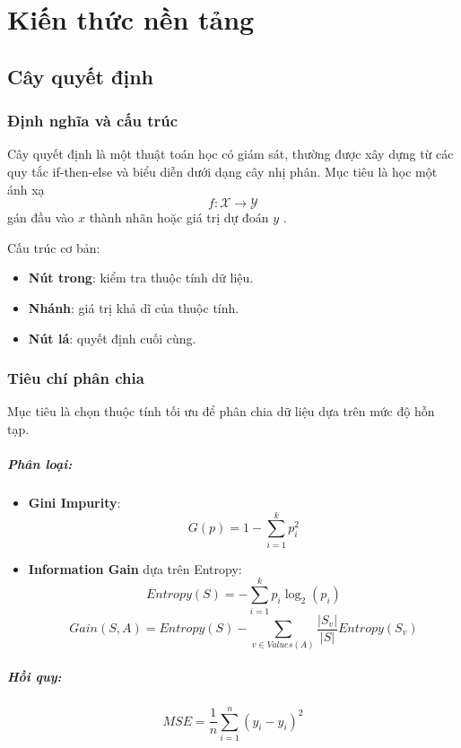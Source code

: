 \chapter{Kiến thức nền tảng}

\section{Cây quyết định}

\subsection{Định nghĩa và cấu trúc}
Cây quyết định là một thuật toán học có giám sát, thường được xây dựng từ các quy tắc if-then-else và biểu diễn dưới dạng cây nhị phân. Mục tiêu là học một ánh xạ
\[
f: \mathcal{X} \to \mathcal{Y}
\]
gán đầu vào $x$ thành nhãn hoặc giá trị dự đoán $y$ \parencite{russell2021}.  

\noindent Cấu trúc cơ bản:
\begin{itemize}
    \item \textbf{Nút trong}: kiểm tra thuộc tính dữ liệu.
    \item \textbf{Nhánh}: giá trị khả dĩ của thuộc tính.
    \item \textbf{Nút lá}: quyết định cuối cùng.
\end{itemize}

\subsection{Tiêu chí phân chia}
Mục tiêu là chọn thuộc tính tối ưu để phân chia dữ liệu dựa trên mức độ hỗn tạp.  

\paragraph{Phân loại:}
\begin{itemize}
    \item \textbf{Gini Impurity}:
    \[
    G(p) = 1 - \sum_{i=1}^k p_i^2
    \]
    \item \textbf{Information Gain} dựa trên Entropy:
    \[
    Entropy(S) = -\sum_{i=1}^k p_i \log_2(p_i)
    \]
    \[
    Gain(S,A) = Entropy(S) - \sum_{v \in Values(A)} \frac{|S_v|}{|S|} Entropy(S_v)
    \]
\end{itemize}

\paragraph{Hồi quy:}
\[
MSE = \frac{1}{n} \sum_{i=1}^n (y_i - \hat{y}_i)^2
\]

